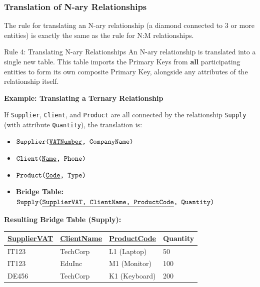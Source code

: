 \subsubsection{Translation of N-ary Relationships}
The rule for translating an N-ary relationship (a diamond connected to 3 or more entities) is exactly the same as the rule for N:M relationships.

\vs
\begin{defbox}{Rule 4: Translating N-ary Relationships}
An N-ary relationship is translated into a single new table. This table imports the Primary Keys from \textbf{all} participating entities to form its own composite Primary Key, alongside any attributes of the relationship itself.
\end{defbox}

\vspace{0.2cm}
\begin{example}{\textbf{Example: Translating a Ternary Relationship}}
    
If \texttt{Supplier}, \texttt{Client}, and \texttt{Product} are all connected by the relationship \texttt{Supply} (with attribute \texttt{Quantity}), the translation is:
\begin{itemize}
    \item $\texttt{Supplier(\underline{VATNumber}, CompanyName)}$
    \item $\texttt{Client(\underline{Name}, Phone)}$
    \item $\texttt{Product(\underline{Code}, Type)}$
    \item \textbf{Bridge Table:} $\texttt{Supply(\underline{SupplierVAT, ClientName, ProductCode}, Quantity)}$
\end{itemize}

\vs
\textbf{Resulting Bridge Table (Supply):}

\vs
\begin{center}
\begin{tabular}{|l|l|l|l|}
\hline
\textbf{\underline{SupplierVAT}} & \textbf{\underline{ClientName}} & \textbf{\underline{ProductCode}} & \textbf{Quantity} \\
\hline
IT123 & TechCorp & L1 (Laptop) & 50 \\
IT123 & EduInc & M1 (Monitor) & 100 \\
DE456 & TechCorp & K1 (Keyboard) & 200 \\
\hline
\end{tabular}
\end{center}
\end{example}

